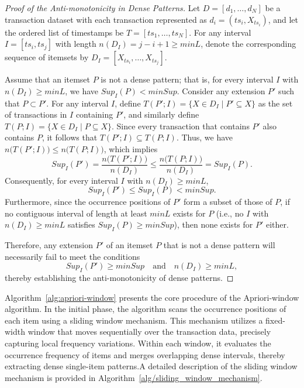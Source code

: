 \begin{proof}[Proof of the Anti-monotonicity in Dense Patterns]
Let \( D = [d_1, \dots, d_N] \) be a transaction dataset with each transaction represented as \( d_i = (ts_i, X_{ts_i}) \), and let the ordered list of timestamps be \( T = [ts_1, \dots, ts_N] \). For any interval \( I = [ts_i, ts_j] \) with length $n(D_I) = j - i + 1 \ge \textit{minL}$,
denote the corresponding sequence of itemsets by
$D_I = [X_{ts_i}, \dots, X_{ts_j}]$.

Assume that an itemset \( P \) is not a dense pattern; that is, for every interval \( I \) with \( n(D_I) \ge \textit{minL} \), we have
$Sup_I(P) < \textit{minSup}$.
Consider any extension \( P' \) such that \( P \subset P' \). For any interval \( I \), define
$T(P'; I) = \{ X \in D_I \mid P' \subseteq X \}$
as the set of transactions in \( I \) containing \( P' \), and similarly define
$T(P; I) = \{ X \in D_I \mid P \subseteq X \}$.
Since every transaction that contains \( P' \) also contains \( P \), it follows that
$T(P'; I) \subseteq T(P; I)$.
Thus, we have
$n\bigl(T(P'; I)\bigr) \le n\bigl(T(P; I)\bigr)$,
which implies
\[
Sup_I(P') = \frac{n\bigl(T(P'; I)\bigr)}{n(D_I)} \le \frac{n\bigl(T(P; I)\bigr)}{n(D_I)} = Sup_I(P).
\]
Consequently, for every interval \( I \) with \( n(D_I) \ge \textit{minL} \),
\[
Sup_I(P') \le Sup_I(P) < \textit{minSup}.
\]
Furthermore, since the occurrence positions of \( P' \) form a subset of those of \( P \), if no contiguous interval of length at least \(\textit{minL}\) exists for \( P \) (i.e., no \( I \) with \( n(D_I) \ge \textit{minL} \) satisfies \( Sup_I(P) \ge \textit{minSup} \)), then none exists for \( P' \) either.

Therefore, any extension \( P' \) of an itemset \( P \) that is not a dense pattern will necessarily fail to meet the conditions
\[
Sup_I(P') \ge \textit{minSup} \quad \text{and} \quad n(D_I) \ge \textit{minL},
\]
thereby establishing the anti-monotonicity of dense patterns.
\end{proof}





Algorithm~\ref{alg:apriori-window} presents the core procedure of the Apriori-window algorithm. In the initial phase, the algorithm scans the occurrence positions of each item using a sliding window mechanism. This mechanism utilizes a fixed-width window that moves sequentially over the transaction data, precisely capturing local frequency variations. Within each window, it evaluates the occurrence frequency of items and merges overlapping dense intervals, thereby extracting dense single-item patterns.A detailed description of the sliding window mechanism is provided in Algorithm~\ref{alg/sliding_window_mechanism}.

